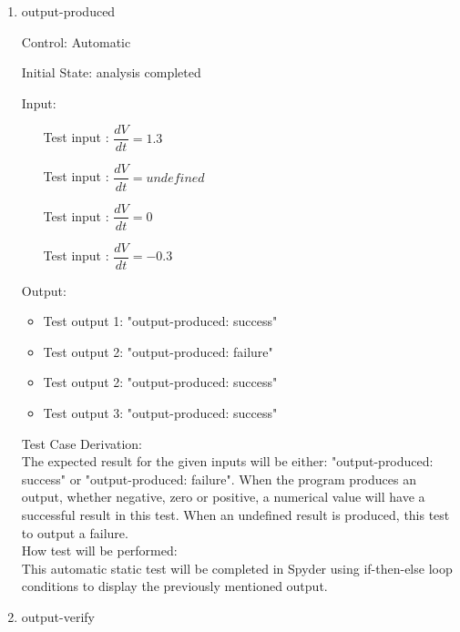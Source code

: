 \documentclass[12pt, titlepage]{article}
\newcounter{tinnum} %
\begin{document}
\begin{enumerate}

\item{output-produced\\}

Control: Automatic
					
Initial State: \progname{} analysis completed 
					
Input:
\begin{itemize}
\item[Test input \refstepcounter{tinnum}\thetinnum\label{Tinput_12}:] 
$\dfrac{dV}{dt} = 1.3$ %
\item[Test input \refstepcounter{tinnum}\thetinnum\label{Tinput_13}:]
$\dfrac{dV}{dt} = undefined$ %
\item[Test input \refstepcounter{tinnum}\thetinnum\label{Tinput_14}:] 
$\dfrac{dV}{dt} = 0$ %
\item[Test input \refstepcounter{tinnum}\thetinnum\label{Tinput_15}:] 
$\dfrac{dV}{dt} = -0.3$

\end{itemize}

Output: 
\begin{itemize}
\item Test output 1: "output-produced: success"
\item Test output 2: "output-produced: failure"
\item Test output 2: "output-produced: success" 
\item Test output 3: "output-produced: success"

\end{itemize}

Test Case Derivation:\\
The expected result for the given inputs will be either: "output-produced: 
success" or  "output-produced: failure". When the program produces an output, 
whether negative, zero or positive, a numerical value will have a successful 
result in this test. When an undefined result is produced, this test to output a 
failure.\\

How test will be performed: \\
This automatic static test will be completed in Spyder using if-then-else loop 
conditions to display the previously mentioned output. \\

					
\item{output-verify\\}


\end{enumerate}
\end{document}

